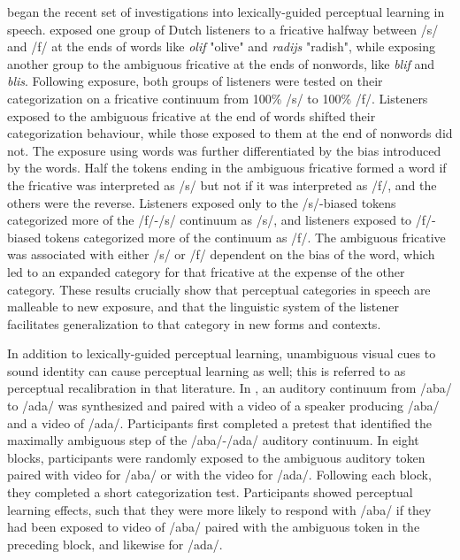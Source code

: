 \citet{Norris2003} began the recent set of investigations into lexically-guided perceptual learning in speech.
\citet{Norris2003} exposed one group of Dutch listeners to a fricative halfway between /s/ and /f/ at the ends of words like \emph{olif} "olive" and \emph{radijs} "radish", while exposing another group to the ambiguous fricative at the ends of nonwords, like \emph{blif} and \emph{blis}.
Following exposure, both groups of listeners were tested on their categorization on a fricative continuum from 100\% /s/ to 100\% /f/. 
Listeners exposed to the ambiguous fricative at the end of words shifted their categorization behaviour, while those exposed to them at the end of nonwords did not.  The exposure using words was further differentiated by the bias introduced by the words.  
Half the tokens ending in the ambiguous fricative formed a word if the fricative was interpreted as /s/ but not if it was interpreted as /f/, and the others were the reverse.  
Listeners exposed only to the /s/-biased tokens categorized more of the /f/-/s/ continuum as /s/, and listeners exposed to /f/-biased tokens categorized more of the continuum as /f/.  
The ambiguous fricative was associated with either /s/ or /f/ dependent on the bias of the word, which led to an expanded category for that fricative at the expense of the other category.
These results crucially show that perceptual categories in speech are malleable to new exposure, and that the linguistic system of the listener facilitates generalization to that category in new forms and contexts.

In addition to lexically-guided perceptual learning, unambiguous visual cues to sound identity can cause perceptual learning as well; this is referred to as perceptual recalibration in that literature.
In \citet{Bertelson2003}, an auditory continuum from /aba/ to /ada/ was synthesized and paired with a video of a speaker producing /aba/ and a video of /ada/.  
Participants first completed a pretest that identified the maximally ambiguous step of the /aba/-/ada/ auditory continuum. 
 In eight blocks, participants were randomly exposed to the ambiguous auditory token paired with video for /aba/ or with the video for /ada/.  Following each block, they completed a short categorization test.  
Participants showed perceptual learning effects, such that they were more likely to respond with /aba/ if they had been exposed to video of /aba/ paired with the ambiguous token in the preceding block, and likewise for /ada/.

